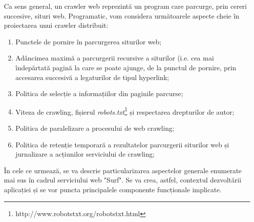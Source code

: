\newcommand{\robotsTxtDescription}{http://www.robotstxt.org/robotstxt.html}

Ca sens general, un crawler web reprezintă un program care parcurge, prin cereri succesive, situri web. Programatic, vom considera următoarele aspecte cheie în proiectarea unui crawler distribuit:

\begin{enumerate}

	\item{Punctele de pornire în parcurgerea siturilor web;}
	
	\item{Adâncimea maximă a parcurgerii recursive a siturilor (i.e. cea mai îndepărtată pagină la care se poate ajunge, de la punctul de pornire, prin accesarea succesivă a legaturilor de tipul hyperlink;}
	
	\item{Politica de selecție a informațiilor din paginile parcurse\cite{web-crawler-selection-policy};}
	
	\item{Viteza de crawling, fișierul \emph{robots.txt}\footnote{\robotsTxtDescription} și respectarea drepturilor de autor;}
	
	\item{Politica de paralelizare a procesului de web crawling;}
	
	\item{Politica de retenție temporară a rezultatelor parcurgerii siturilor web și jurnalizare a acțiunilor serviciului de crawling;}
	
\end{enumerate}

În cele ce urmează, se va descrie particularizarea aspectelor generale enumerate mai sus în cadrul serviciului web "Surf". Se va crea, astfel, contextul dezvoltării aplicației și se vor puncta principalele componente funcționale implicate.
